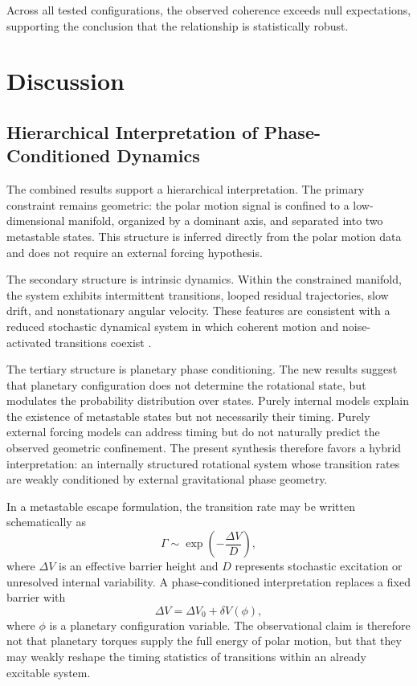 \documentclass[twocolumn,9pt]{revtex4-2}
\begin{document}
Across all tested configurations, the observed coherence exceeds null expectations,
supporting the conclusion that the relationship is statistically robust.

\section{Discussion}
\label{sec:discussion}



\subsection{Hierarchical Interpretation of Phase-Conditioned Dynamics}
\label{subsec:hierarchical_phase_conditioned_dynamics}

The combined results support a hierarchical interpretation. The primary constraint remains geometric: the polar motion signal is confined to a low-dimensional manifold, organized by a dominant axis, and separated into two metastable states. This structure is inferred directly from the polar motion data and does not require an external forcing hypothesis.

The secondary structure is intrinsic dynamics. Within the constrained manifold, the system exhibits intermittent transitions, looped residual trajectories, slow drift, and nonstationary angular velocity. These features are consistent with a reduced stochastic dynamical system in which coherent motion and noise-activated transitions coexist \citep{prigogine1984,kramers1940,risken1989}.

The tertiary structure is planetary phase conditioning. The new results suggest that planetary configuration does not determine the rotational state, but modulates the probability distribution over states. Purely internal models explain the existence of metastable states but not necessarily their timing. Purely external forcing models can address timing but do not naturally predict the observed geometric confinement. The present synthesis therefore favors a hybrid interpretation: an internally structured rotational system whose transition rates are weakly conditioned by external gravitational phase geometry.

In a metastable escape formulation, the transition rate may be written schematically as
\begin{equation}
\Gamma \sim \exp\left(-\frac{\Delta V}{D}\right),
\end{equation}
where $\Delta V$ is an effective barrier height and $D$ represents stochastic excitation or unresolved internal variability. A phase-conditioned interpretation replaces a fixed barrier with
\begin{equation}
\Delta V = \Delta V_0 + \delta V(\phi),
\end{equation}
where $\phi$ is a planetary configuration variable. The observational claim is therefore not that planetary torques supply the full energy of polar motion, but that they may weakly reshape the timing statistics of transitions within an already excitable system.
\end{document}
